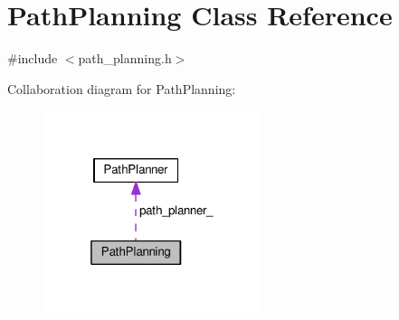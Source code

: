 \hypertarget{classPathPlanning}{\section{Path\-Planning Class Reference}
\label{classPathPlanning}
}


{\ttfamily \#include $<$path\-\_\-planning.\-h$>$}



Collaboration diagram for Path\-Planning\-:
\nopagebreak
\begin{figure}[H]
\begin{center}
\leavevmode
\includegraphics[width=181pt]{classPathPlanning__coll__graph}
\end{center}
\end{figure}
